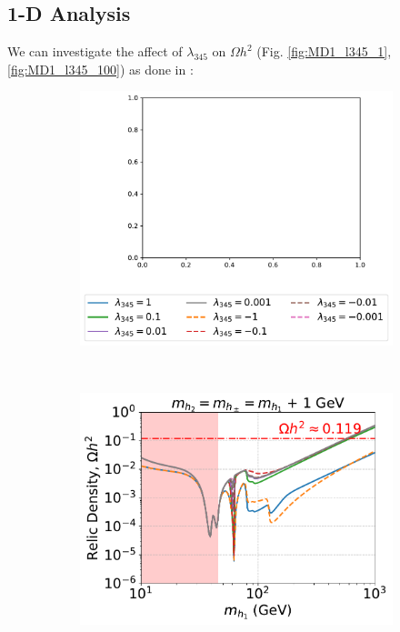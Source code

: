 \documentclass[12pt]{article}
\begin{document}
\subsection{1-D Analysis}
\label{1-D scan}
We can investigate the affect of $\lambda_{345}$ on $\Omega h^2$ (Fig. \ref{fig:MD1_l345_1}, \ref{fig:MD1_l345_100}) as done in \cite{Belyaev:2016lok}:
\begin{figure}[H]
    \centering
    \begin{subfigure}[b]{0.49\textwidth}
        \centering
        \includegraphics[width=1.2\textwidth, trim={0pt 0pt 0pt 11cm}, clip]{plots/plot_MD1_l345_legend.pdf}
        \label{fig:MD1_l345_le}
    \end{subfigure}
    \\
    \centering
    \begin{subfigure}[b]{0.49\textwidth}
        \centering
        \includegraphics[width=\textwidth]{plots/plot_MD1_l345+1_(no_legend).pdf}

\end{subfigure}
\end{figure}
\end{document}
